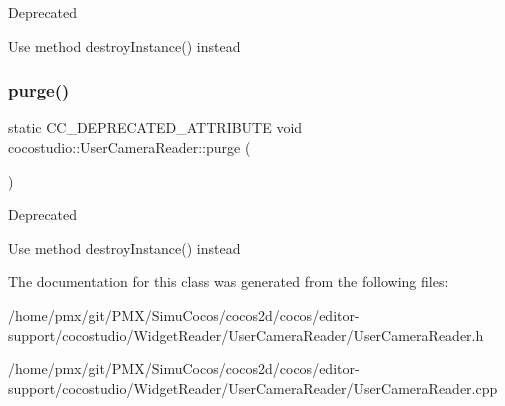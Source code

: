\begin{DoxyRefDesc}{Deprecated}
\item[\hyperlink{deprecated__deprecated000111}{Deprecated}]Use method destroy\+Instance() instead \end{DoxyRefDesc}
\mbox{\label{classcocostudio_1_1UserCameraReader_a251a6f212c3a95d29378bf37af3a7bcf}} 
\subsubsection{\texorpdfstring{purge()}{purge()}\hspace{0.1cm}{\footnotesize\ttfamily [2/2]}}
{\footnotesize\ttfamily static C\+C\+\_\+\+D\+E\+P\+R\+E\+C\+A\+T\+E\+D\+\_\+\+A\+T\+T\+R\+I\+B\+U\+TE void cocostudio\+::\+User\+Camera\+Reader\+::purge (\begin{DoxyParamCaption}{ }\end{DoxyParamCaption})\hspace{0.3cm}{\ttfamily [static]}}

\begin{DoxyRefDesc}{Deprecated}
\item[\hyperlink{deprecated__deprecated000346}{Deprecated}]Use method destroy\+Instance() instead \end{DoxyRefDesc}


The documentation for this class was generated from the following files\+:\begin{DoxyCompactItemize}
\item 
/home/pmx/git/\+P\+M\+X/\+Simu\+Cocos/cocos2d/cocos/editor-\/support/cocostudio/\+Widget\+Reader/\+User\+Camera\+Reader/User\+Camera\+Reader.\+h\item 
/home/pmx/git/\+P\+M\+X/\+Simu\+Cocos/cocos2d/cocos/editor-\/support/cocostudio/\+Widget\+Reader/\+User\+Camera\+Reader/User\+Camera\+Reader.\+cpp\end{DoxyCompactItemize}
